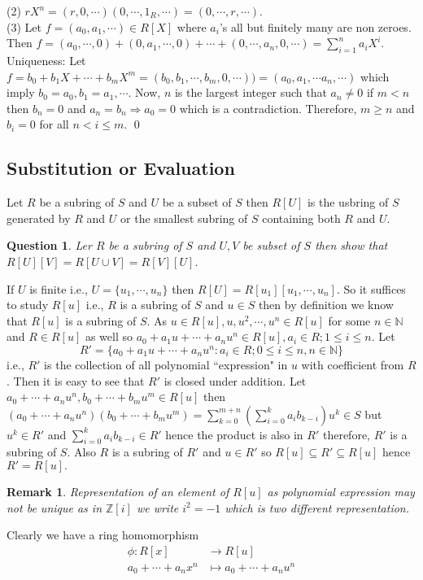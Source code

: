 \documentclass[11pt]{amsart}
\newtheorem{qns}[theorem]{Question}
\newtheorem{remark}[theorem]{Remark}%
\newcommand{\ZZ}{\mathbb Z}
\newcommand{\NN}{\mathbb N}
\begin{document}
(2) $rX^n=(r,0,\cdots )(0,\cdots ,1_R,\cdots )=(0,\cdots ,r,\cdots ).$\\
(3) Let $f=(a_0,a_1,\cdots )\in R[X]$ where $a_i$'s all but finitely many are non zeroes. Then $f=(a_0,\cdots ,0)+(0,a_1,\cdots ,0)+\cdots +(0,\cdots ,a_n,0,\cdots )=\displaystyle\sum_{i=1}^n a_iX^i.$\\
Uniqueness: Let $f=b_0+b_1X+\cdots +b_mX^m=(b_0,b_1,\cdots ,b_m,0,\cdots ))=(a_0,a_1,\cdots a_n,\cdots )$ which imply $b_0=a_0, b_1=a_1,\cdots $. Now, $n$ is the largest integer such that $a_n\neq 0$ if $m<n$ then $b_n=0$ and $a_n=b_n \Rightarrow a_0=0$ which is a contradiction. Therefore, $m\geq n$ and $b_i=0$ for all $n<i\leq m.$ \qed 

\subsection{Substitution or Evaluation}
Let $R$ be a subring of $S$ and $U$ be a subset of $S$ then $R[U]$ is the usbring of $S$ generated by $R$ and $U$ or the smallest subring of $S$ containing both $R$ and $U$. 
\begin{qns}
Ler $R$ be a subring of $S$ and $U,V$ be subset of $S$ then show that $R[U][V]=R[U\cup V]=R[V][U]$.
\end{qns}
If $U$ is finite i.e., $U=\{u_1,\cdots,u_n\}$ then $R[U]=R[u_1][u_1,\cdots,u_n].$ So it suffices to study $R[u]$ i.e., $R$ is a subring of $S$ and $u\in S$ then by definition we know that $R[u]$ is a subring of $S$. As $u\in R[u],u,u^2,\cdots,u^n\in R[u]$ for some $n\in {\NN}$ and $R\in R[u]$ as well so $a_0+a_1u+\cdots+a_nu^n\in R[u],a_i\in R;1\leq i\leq n.$ Let $$R'=\{a_0+a_1u+\cdots+a_nu^n:a_i\in R;0\leq i\leq n,n\in {\NN}\}$$
i.e., $R'$ is the collection of all polynomial ``expression" in $u$ with coefficient from $R$. Then it is easy to see that $R'$ is closed under addition. Let $a_0+\cdots+a_nu^n,b_0+\cdots+b_mu^m\in R[u]$ then $(a_0+\cdots+a_nu^n)(b_0+\cdots+b_mu^m)=\displaystyle\sum_{k=0}^{m+n}\left(\displaystyle\sum_{i=0}^k a_ib_{k-i}\right)u^k\in S$ but $u^k\in R'$ and $\displaystyle\sum_{i=0}^k a_ib_{k-i}\in R'$ hence the product is also in $R'$ therefore, $R'$ is a subring of $S$. Also $R$ is a subring of $R'$ and $u\in R'$ so $R[u]\subseteq R'\subseteq R[u]$ hence $R'=R[u].$
\begin{remark}
Representation of an element of $R[u]$ as polynomial expression may not be unique as in ${\ZZ}[i]$ we write $i^2=-1$ which is two different representation.
\end{remark}
 Clearly we have a ring homomorphism \begin{align*}
 \phi:R[x]&\to R[u]\\
 a_0+\cdots+a_nx^n&\mapsto a_0+\cdots+a_nu^n
 \end{align*}
\end{document}
